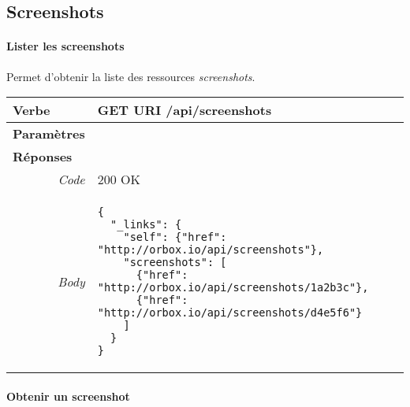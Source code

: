 \begin{appendices}

\begin{absolutelynopagebreak}
\section{Screenshots}

\paragraph{Lister les screenshots}

Permet d'obtenir la liste des ressources \emph{screenshots}.

\begin{tabular}{@{}p{2cm}p{11.5cm}@{}}
    \toprule
    \textbf{Verbe}                        & GET \hspace{2.5cm} \textbf{URI} \hspace{0.25cm} /api/screenshots   \\ \midrule
    \textbf{Paramètres}                   &        \\ \midrule
    \textbf{Réponses}                     &        \\
    \multicolumn{1}{r}{\textit{Code}}   & 200 OK \\
    \multicolumn{1}{r}{\textit{Body}}   & \begin{verbatim}
{
  "_links": {
    "self": {"href": "http://orbox.io/api/screenshots"},
    "screenshots": [
      {"href": "http://orbox.io/api/screenshots/1a2b3c"},
      {"href": "http://orbox.io/api/screenshots/d4e5f6"}
    ]
  }
}
\end{verbatim}
    \\ \bottomrule
\end{tabular}
\end{absolutelynopagebreak}
  
\begin{absolutelynopagebreak}
\paragraph{Obtenir un screenshot}


\end{absolutelynopagebreak}
\end{appendices}
